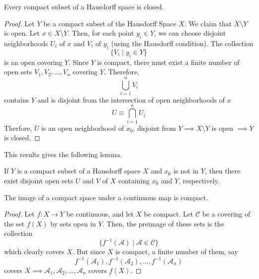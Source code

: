     \begin{theorem}
    Every compact subset of a Hausdorff space is closed. 
    \end{theorem}
    \begin{proof}
    Let $Y$ be a compact subset of the Hausdorff Space $X$. We claim that $X \setminus Y$ is open. Let $x \in X \setminus Y$. Then, for each point $y_i \in Y$, we can choose disjoint neighborhoods $U_i$ of $x$ and $V_i$ of $y_i$ (using the Hausdorff condition). The collection 
    \[\{V_i \; | \; y_i \in Y\}\]
    is an open covering $Y$. Since $Y$ is compact, there must exist a finite number of open sets $V_1, V_2, ..., V_n$ covering $Y$. Therefore, 
    \[\bigcup_{i=1}^n V_i\]
    contains $Y$ and is disjoint from the intersection of open neighborhoods of $x$
    \[U \equiv \bigcap_{i=1}^n U_i\]
    Therfore, $U$ is an open neighborhood of $x_0$, disjoint from $Y \implies X \setminus Y$ is open $\implies Y$ is closed.
    \end{proof}

    This results gives the following lemma. 

    \begin{lemma}
    If $Y$ is a compact subset of a Hausdorff space $X$ and $x_0$ is not in $Y$, then there exist disjoint open sets $U$ and $V$ of $X$ containing $x_0$ and $Y$, respectively. 
    \end{lemma}

    \begin{center}
    \end{center}

    \begin{theorem}
    The image of a compact space under a continuous map is compact.
    \end{theorem}
    \begin{proof}
    Let $f: X \longrightarrow Y$ be continuous, and let $X$ be compact. Let $\mathcal{C}$ be a covering of the set $f(X)$ by sets open in $Y$. Then, the preimage of these sets is the collection
    \[\{f^{-1}(\mathcal{A}) \; | \; \mathcal{A} \in \mathcal{C}\}\]
    which clearly covers $X$. But since $X$ is compact, a finite number of them, say
    \[f^{-1} (\mathcal{A}_1), f^{-1} (\mathcal{A}_2), ..., f^{-1} (\mathcal{A}_n)\]
    covers $X \implies \mathcal{A}_1, \mathcal{A}_2, ..., \mathcal{A}_n$ covers $f(X)$. 
    \end{proof}

